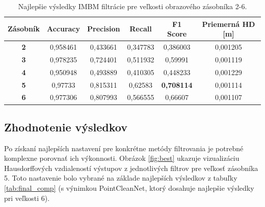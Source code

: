 \begin{table}[h]
	\caption{\label{tab:imbm_best} Najlepšie výsledky IMBM filtrácie pre veľkosti obrazového zásobníka 2-6. }
	\centering
	\begin{tabular}{cccccc}
		\toprule
		\textbf{Zásobník} & \textbf{Accuracy} & \textbf{Precision} & \textbf{Recall} & \textbf{F1 Score} & \textbf{Priemerná HD [m]} \\ 
		\midrule
		\textbf{2}           & 0,958461          & 0,433661           & 0,347783        & 0,386003          & 0,001205           \\ 
		\textbf{3}           & 0,978235          & 0,724401           & 0,511932        & 0,59991           & 0,001119           \\ 
		\textbf{4}           & 0,950948          & 0,493889           & 0,410305        & 0,448233          & 0,001229           \\ 
		\textbf{5}           & 0,97733           & 0,815311           & 0,62583         & \textbf{0,708114}          & 0,001114           \\ 
		\textbf{6}           & 0,977306          & 0,807993           & 0,566555        & 0,66607           & 0,001107           \\ 
		\bottomrule
	\end{tabular}
\end{table}

\subsection{Zhodnotenie výsledkov}

Po získaní najlepších nastavení pre konkrétne metódy filtrovania je potrebné komplexne porovnať ich výkonnosti. Obrázok \ref{fig:best} ukazuje vizualizáciu Hausdorffových vzdialeností výstupov z jednotlivých filtrov pre veľkosť zásobníka 5. Toto nastavenie bolo vybrané na základe najlepších výsledkov z tabuľky \ref {tab:final_comp} (s výnimkou PointCleanNet, ktorý dosahuje najlepšie výsledky pri veľkosti 6).

